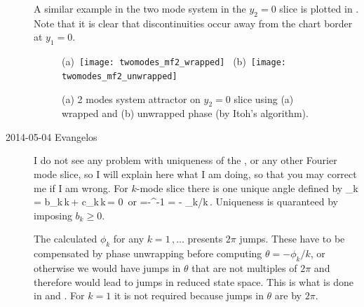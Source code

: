 \begin{description}
A similar example in the two mode system in the $y_2=0$ slice is plotted in .
Note that it is clear that discontinuities occur away from the chart border at $y_1=0$.

\begin{figure}
\begin{center}
(a)~\texttt{[image: twomodes\_mf2\_wrapped]}~
(b)~\texttt{[image: twomodes\_mf2\_unwrapped]}
\end{center}
\caption{
(a) 2 modes system attractor on $y_2=0$ slice using (a) wrapped and (b) unwrapped phase (by Itoh's algorithm).
}
\label{f:2modes_unwrapping}
\end{figure}

\item[2014-05-04 Evangelos] I do not see any problem with uniqueness of the
{\sFslice}, or any other Fourier mode slice, so I will explain
here what I am doing, so that you may correct me if I am wrong. For $k$-mode
slice there is one unique angle defined by
\beq
   _k = b_k\,\sin k\,\theta + c_k\,\cos k\,\theta  = 0\,
   \label{eq:SO2norm}
\eeq
or
\beq
   \theta=-\tan^{-1} = - \phi_k/k\,.
   \label{eq:SO2mf}
\eeq
Uniqueness is quaranteed by imposing $b_k\geq0$.

The calculated $\phi_k$ for any $k=1\,,\ldots$ presents $2\pi$ jumps. These have to
be compensated by phase unwrapping before computing $\theta=-\phi_k/k$, or otherwise we would
have jumps in $\theta$ that are not multiples of $2\pi$ and therefore would lead
to jumps in reduced state space. This is what is done in 
and . For $k=1$ it is not required because
jumps in $\theta$ are by $2\pi$.


\end{description}
